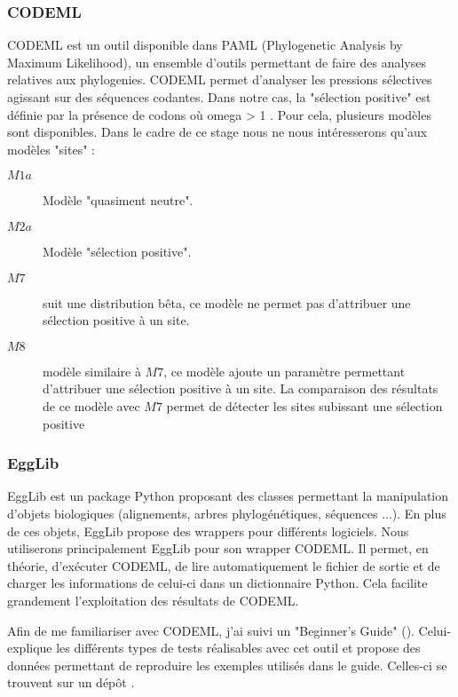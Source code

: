\documentclass[../main]{subfiles} %
\begin{document}
\subsubsection{CODEML}
\label{sec:CODEML}
\gls{CODEML} est un outil disponible dans \gls{PAML} (Phylogenetic Analysis by Maximum Likelihood), un ensemble d'outils permettant de faire des analyses relatives aux \glspl{phylogenie}. \gls{CODEML} permet d'analyser les pressions sélectives agissant sur des séquences codantes. Dans notre cas, la "sélection positive" est définie par la présence de \glspl{codon} où \acrshort{omega} > 1  \cite{alvarez-carretero_beginners_2023}. Pour cela, plusieurs modèles sont disponibles. Dans le cadre de ce stage nous ne nous intéresserons qu'aux modèles "sites" :
\begin{description}
    \item [$M1a$] Modèle "quasiment neutre".  \cite{alvarez-carretero_beginners_2023}
    \item [$M2a$] Modèle "sélection positive". \cite{alvarez-carretero_beginners_2023}
    \item [$M7$] suit une distribution bêta, ce modèle ne permet pas d'attribuer une sélection positive à un site. \cite{yang_codon-substitution_2000}
    \item [$M8$] modèle similaire à $M7$, ce modèle ajoute un paramètre permettant d'attribuer une sélection positive à un site. La comparaison des résultats de ce modèle avec $M7$ permet de détecter les sites subissant une sélection positive \cite{yang_codon-substitution_2000}

\end{description}


\subsubsection{EggLib}
\label{sec:EggLib}
\gls{EggLib} est un package \gls{Python} proposant des classes permettant la manipulation d'objets biologiques (alignements, arbres phylogénétiques, séquences ...). En plus de ces objets, \gls{EggLib} propose des \glspl{wrapper} pour différents logiciels. Nous utiliserons principalement \gls{EggLib} pour son \gls{wrapper} \gls{CODEML}. Il permet, en théorie, d'exécuter \gls{CODEML}, de lire automatiquement le fichier de sortie et de charger les informations de celui-ci dans un dictionnaire \gls{Python}. Cela facilite grandement l'exploitation des résultats de \gls{CODEML}.

\label{sec:FamiCodeml}
Afin de me familiariser avec \gls{CODEML}, j'ai suivi un "Beginner's Guide" (\cite{alvarez-carretero_beginners_2023}). Celui-explique les différents types de tests réalisables avec cet outil et propose des données permettant de reproduire les exemples utilisés dans le guide. Celles-ci se trouvent sur un dépôt \GitHub \cite{noauthor_paml-tutorialpositive-selection_nodate}.
\end{document}
